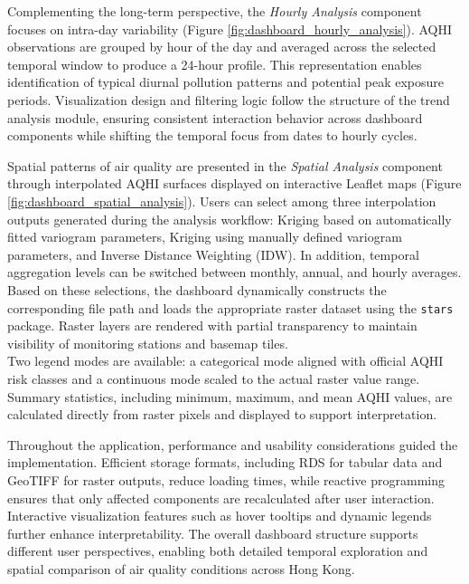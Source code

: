 \documentclass[manuscript,nonacm]{acmart}
\begin{document}
        Complementing the long-term perspective, the \emph{Hourly Analysis} component focuses on intra-day variability (Figure \ref{fig:dashboard_hourly_analysis}). AQHI observations are grouped by hour of the day and averaged across the selected temporal window to produce a 24-hour profile. This representation enables identification of typical diurnal pollution patterns and potential peak exposure periods. Visualization design and filtering logic follow the structure of the trend analysis module, ensuring consistent interaction behavior across dashboard components while shifting the temporal focus from dates to hourly cycles.

        Spatial patterns of air quality are presented in the \emph{Spatial Analysis} component through interpolated AQHI surfaces displayed on interactive Leaflet maps (Figure \ref{fig:dashboard_spatial_analysis}). Users can select among three interpolation outputs generated during the analysis workflow: Kriging based on automatically fitted variogram parameters, Kriging using manually defined variogram parameters, and Inverse Distance Weighting (IDW). In addition, temporal aggregation levels can be switched between monthly, annual, and hourly averages. Based on these selections, the dashboard dynamically constructs the corresponding file path and loads the appropriate raster dataset using the \texttt{stars} package. Raster layers are rendered with partial transparency to maintain visibility of monitoring stations and basemap tiles.\\
        Two legend modes are available: a categorical mode aligned with official AQHI risk classes and a continuous mode scaled to the actual raster value range. Summary statistics, including minimum, maximum, and mean AQHI values, are calculated directly from raster pixels and displayed to support interpretation.

        Throughout the application, performance and usability considerations guided the implementation. Efficient storage formats, including RDS for tabular data and GeoTIFF for raster outputs, reduce loading times, while reactive programming ensures that only affected components are recalculated after user interaction. Interactive visualization features such as hover tooltips and dynamic legends further enhance interpretability. The overall dashboard structure supports different user perspectives, enabling both detailed temporal exploration and spatial comparison of air quality conditions across Hong Kong.
\end{document}
